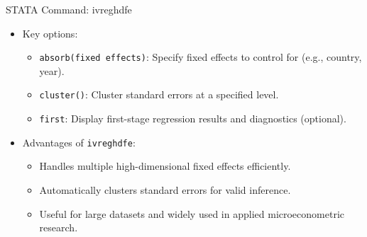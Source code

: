 \documentclass[dvipsnames,hyperref={pdfpagelabels=false}]{beamer}
\begin{document}
\begin{frame}{STATA Command: ivreghdfe}
	\begin{itemize}
		\item Key options:
		\begin{itemize}
			\vspace{0.2cm}
			\item \texttt{absorb(fixed effects)}: Specify fixed effects to control for (e.g., country, year).
			\vspace{0.2cm}
			\item \texttt{cluster()}: Cluster standard errors at a specified level.
			\vspace{0.2cm}
			\item \texttt{first}: Display first-stage regression results and diagnostics (optional).
		\end{itemize}
		
		\vspace{0.4cm}
		\item Advantages of \texttt{ivreghdfe}:
		\begin{itemize}
			\vspace{0.2cm}
			\item Handles multiple high-dimensional fixed effects efficiently.
			\vspace{0.2cm}
			\item Automatically clusters standard errors for valid inference.
			\vspace{0.2cm}
			\item Useful for large datasets and widely used in applied microeconometric research.
		\end{itemize}
	\end{itemize}
\end{frame}
\end{document}
